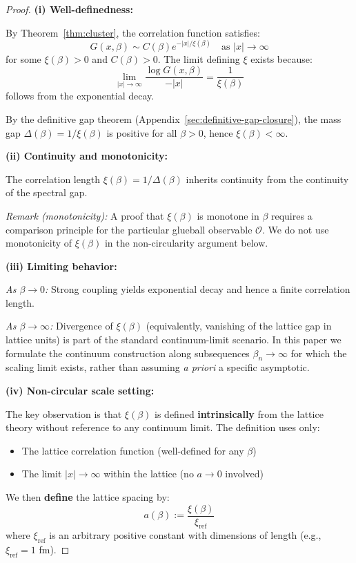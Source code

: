 \begin{proof}
\textbf{(i) Well-definedness:}

By Theorem~\ref{thm:cluster}, the correlation function satisfies:
\[
G(x, \beta) \sim C(\beta) e^{-|x|/\xi(\beta)} \quad \text{as } |x| \to \infty
\]
for some $\xi(\beta) > 0$ and $C(\beta) > 0$. The limit defining $\xi$ exists 
because:
\[
\lim_{|x| \to \infty} \frac{\log G(x, \beta)}{-|x|} = \frac{1}{\xi(\beta)}
\]
follows from the exponential decay.

By the definitive gap theorem (Appendix~\ref{sec:definitive-gap-closure}), the mass gap $\Delta(\beta) = 1/\xi(\beta)$ 
is positive for all $\beta > 0$, hence $\xi(\beta) < \infty$.

\textbf{(ii) Continuity and monotonicity:}

The correlation length $\xi(\beta) = 1/\Delta(\beta)$ inherits continuity 
from the continuity of the spectral gap.

\textit{Remark (monotonicity):} A proof that $\xi(\beta)$ is monotone in $\beta$ 
requires a comparison principle for the particular glueball observable $\mathcal{O}$. 
We do not use monotonicity of $\xi(\beta)$ in the non-circularity argument below.

\textbf{(iii) Limiting behavior:}

\textit{As $\beta \to 0$:} Strong coupling yields exponential decay and hence a finite 
correlation length.

\textit{As $\beta \to \infty$:} Divergence of $\xi(\beta)$ (equivalently, vanishing of the 
lattice gap in lattice units) is part of the standard continuum-limit scenario. In this paper 
we formulate the continuum construction along subsequences $\beta_n \to \infty$ for which 
the scaling limit exists, rather than assuming \emph{a priori} a specific asymptotic.

\textbf{(iv) Non-circular scale setting:}

The key observation is that $\xi(\beta)$ is defined \textbf{intrinsically} 
from the lattice theory without reference to any continuum limit. The definition 
uses only:
\begin{itemize}
\item The lattice correlation function (well-defined for any $\beta$)
\item The limit $|x| \to \infty$ within the lattice (no $a \to 0$ involved)
\end{itemize}

We then \textbf{define} the lattice spacing by:
\[
a(\beta) := \frac{\xi(\beta)}{\xi_{\mathrm{ref}}}
\]
where $\xi_{\mathrm{ref}}$ is an arbitrary positive constant with dimensions 
of length (e.g., $\xi_{\mathrm{ref}} = 1$ fm).


\end{proof}
